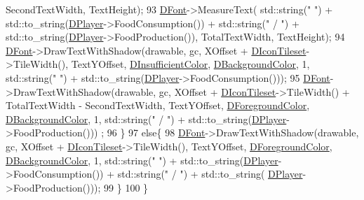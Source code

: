 \begin{DoxyCode}
      SecondTextWidth, TextHeight);
93         \hyperlink{classCResourceRenderer_acd1383d226622757afdcdcf6d9747aa0}{DFont}->MeasureText( std::string(\textcolor{stringliteral}{" "}) + std::to\_string(\hyperlink{classCResourceRenderer_ad8479113a1d9b1ab1a134ca86bc823e0}{DPlayer}->FoodConsumption()) + 
      std::string(\textcolor{stringliteral}{" / "}) + std::to\_string(\hyperlink{classCResourceRenderer_ad8479113a1d9b1ab1a134ca86bc823e0}{DPlayer}->FoodProduction()), TotalTextWidth, TextHeight);
94         \hyperlink{classCResourceRenderer_acd1383d226622757afdcdcf6d9747aa0}{DFont}->DrawTextWithShadow(drawable, gc, XOffset +  \hyperlink{classCResourceRenderer_a6a4bc80e88c35798259d3235785a1a5f}{DIconTileset}->TileWidth(), 
      TextYOffset, \hyperlink{classCResourceRenderer_a628700620a91412c1624fae0db8a9ebb}{DInsufficientColor}, \hyperlink{classCResourceRenderer_a7985a8b9266542c506acc20b12e23ebb}{DBackgroundColor}, 1, std::string(\textcolor{stringliteral}{" "}) + 
      std::to\_string(\hyperlink{classCResourceRenderer_ad8479113a1d9b1ab1a134ca86bc823e0}{DPlayer}->FoodConsumption()));
95         \hyperlink{classCResourceRenderer_acd1383d226622757afdcdcf6d9747aa0}{DFont}->DrawTextWithShadow(drawable, gc, XOffset +  \hyperlink{classCResourceRenderer_a6a4bc80e88c35798259d3235785a1a5f}{DIconTileset}->TileWidth() + 
      TotalTextWidth - SecondTextWidth, TextYOffset, \hyperlink{classCResourceRenderer_a8605027f29776f3042e1c3f9072d4390}{DForegroundColor}, 
      \hyperlink{classCResourceRenderer_a7985a8b9266542c506acc20b12e23ebb}{DBackgroundColor}, 1, std::string(\textcolor{stringliteral}{" / "}) + std::to\_string(\hyperlink{classCResourceRenderer_ad8479113a1d9b1ab1a134ca86bc823e0}{DPlayer}->FoodProduction()))
      ;
96     \}
97     \textcolor{keywordflow}{else}\{
98         \hyperlink{classCResourceRenderer_acd1383d226622757afdcdcf6d9747aa0}{DFont}->DrawTextWithShadow(drawable, gc, XOffset +  \hyperlink{classCResourceRenderer_a6a4bc80e88c35798259d3235785a1a5f}{DIconTileset}->TileWidth(), 
      TextYOffset, \hyperlink{classCResourceRenderer_a8605027f29776f3042e1c3f9072d4390}{DForegroundColor}, \hyperlink{classCResourceRenderer_a7985a8b9266542c506acc20b12e23ebb}{DBackgroundColor}, 1, std::string(\textcolor{stringliteral}{" "}) + 
      std::to\_string(\hyperlink{classCResourceRenderer_ad8479113a1d9b1ab1a134ca86bc823e0}{DPlayer}->FoodConsumption()) + std::string(\textcolor{stringliteral}{" / "}) + std::to\_string(
      \hyperlink{classCResourceRenderer_ad8479113a1d9b1ab1a134ca86bc823e0}{DPlayer}->FoodProduction()));   
99     \}
100 \}
\end{DoxyCode}
